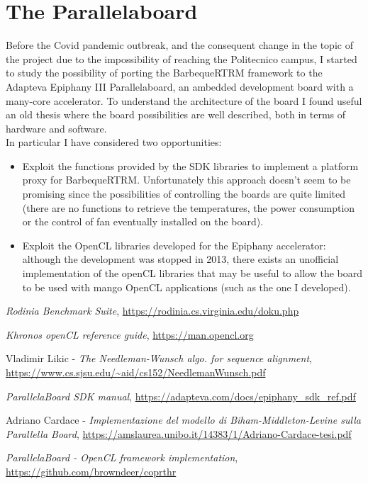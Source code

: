 \section{The Parallelaboard}
Before the Covid pandemic outbreak, and the consequent change in the topic of the project due to the impossibility of reaching the Politecnico campus, I started to study the possibility of porting the BarbequeRTRM framework to the Adapteva Epiphany III Parallelaboard, an ambedded development board with a many-core accelerator. To understand the architecture of the board I found useful an old thesis\cite{pb2} where the board possibilities are well described, both in terms of hardware and software.\\In particular I have considered two opportunities:
\begin{itemize}
      \item Exploit the functions provided by the SDK libraries\cite{pb1} to implement a platform proxy for BarbequeRTRM. Unfortunately this approach doesn't seem to be promising since the possibilities of controlling the boards are quite limited (there are no functions to retrieve the temperatures, the power consumption or the control of fan eventually installed on the board).
      \item Exploit the OpenCL libraries developed for the Epiphany accelerator\cite{pb3}: although the development was stopped in 2013, there exists an unofficial implementation of the openCL libraries that may be useful to allow the board to be used with mango OpenCL applications (such as the one I developed).
\end{itemize}

\begin{thebibliography}{9}

            \textit{Rodinia Benchmark Suite},
            \url{https://rodinia.cs.virginia.edu/doku.php}
      
            \textit{Khronos openCL reference guide},
            \url{https://man.opencl.org}
      
            Vladimir Likic - 
            \textit{The Needleman-Wunsch algo. for sequence alignment},
            \url{https://www.cs.sjsu.edu/~aid/cs152/NeedlemanWunsch.pdf}


            \textit{ParallelaBoard SDK manual},
            \url{https://adapteva.com/docs/epiphany_sdk_ref.pdf}
            
            Adriano Cardace -
            \textit{Implementazione del modello di Biham-Middleton-Levine sulla Parallella Board},
            \url{https://amslaurea.unibo.it/14383/1/Adriano-Cardace-tesi.pdf}

            \textit{ParallelaBoard - OpenCL framework implementation},
            \url{https://github.com/browndeer/coprthr}

            

\end{thebibliography}

